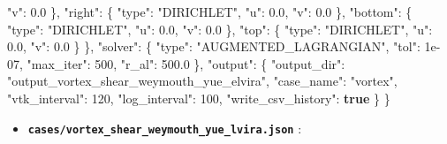 \documentclass[
  10pt,
]{article}
\newenvironment{Shaded}{}{}
\newcommand{\DataTypeTok}[1]{\textcolor[rgb]{0.56,0.13,0.00}{#1}}
\newcommand{\DecValTok}[1]{\textcolor[rgb]{0.25,0.63,0.44}{#1}}
\newcommand{\FloatTok}[1]{\textcolor[rgb]{0.25,0.63,0.44}{#1}}
\newcommand{\FunctionTok}[1]{\textcolor[rgb]{0.02,0.16,0.49}{#1}}
\newcommand{\KeywordTok}[1]{\textcolor[rgb]{0.00,0.44,0.13}{\textbf{#1}}}
\newcommand{\StringTok}[1]{\textcolor[rgb]{0.25,0.44,0.63}{#1}}
\providecommand{\tightlist}{%
  \setlength{\itemsep}{0pt}\setlength{\parskip}{0pt}}
\begin{document}
\begin{Shaded}
\begin{Highlighting}[]
      \DataTypeTok{"v"}\FunctionTok{:} \FloatTok{0.0}
    \FunctionTok{\},}
    \DataTypeTok{"right"}\FunctionTok{:} \FunctionTok{\{}
      \DataTypeTok{"type"}\FunctionTok{:} \StringTok{"DIRICHLET"}\FunctionTok{,}
      \DataTypeTok{"u"}\FunctionTok{:} \FloatTok{0.0}\FunctionTok{,}
      \DataTypeTok{"v"}\FunctionTok{:} \FloatTok{0.0}
    \FunctionTok{\},}
    \DataTypeTok{"bottom"}\FunctionTok{:} \FunctionTok{\{}
      \DataTypeTok{"type"}\FunctionTok{:} \StringTok{"DIRICHLET"}\FunctionTok{,}
      \DataTypeTok{"u"}\FunctionTok{:} \FloatTok{0.0}\FunctionTok{,}
      \DataTypeTok{"v"}\FunctionTok{:} \FloatTok{0.0}
    \FunctionTok{\},}
    \DataTypeTok{"top"}\FunctionTok{:} \FunctionTok{\{}
      \DataTypeTok{"type"}\FunctionTok{:} \StringTok{"DIRICHLET"}\FunctionTok{,}
      \DataTypeTok{"u"}\FunctionTok{:} \FloatTok{0.0}\FunctionTok{,}
      \DataTypeTok{"v"}\FunctionTok{:} \FloatTok{0.0}
    \FunctionTok{\}}
  \FunctionTok{\},}
  \DataTypeTok{"solver"}\FunctionTok{:} \FunctionTok{\{}
    \DataTypeTok{"type"}\FunctionTok{:} \StringTok{"AUGMENTED\_LAGRANGIAN"}\FunctionTok{,}
    \DataTypeTok{"tol"}\FunctionTok{:} \DecValTok{1e{-}07}\FunctionTok{,}
    \DataTypeTok{"max\_iter"}\FunctionTok{:} \DecValTok{500}\FunctionTok{,}
    \DataTypeTok{"r\_al"}\FunctionTok{:} \FloatTok{500.0}
  \FunctionTok{\},}
  \DataTypeTok{"output"}\FunctionTok{:} \FunctionTok{\{}
    \DataTypeTok{"output\_dir"}\FunctionTok{:} \StringTok{"output\_vortex\_shear\_weymouth\_yue\_elvira"}\FunctionTok{,}
    \DataTypeTok{"case\_name"}\FunctionTok{:} \StringTok{"vortex"}\FunctionTok{,}
    \DataTypeTok{"vtk\_interval"}\FunctionTok{:} \DecValTok{120}\FunctionTok{,}
    \DataTypeTok{"log\_interval"}\FunctionTok{:} \DecValTok{100}\FunctionTok{,}
    \DataTypeTok{"write\_csv\_history"}\FunctionTok{:} \KeywordTok{true}
  \FunctionTok{\}}
\FunctionTok{\}}
\end{Highlighting}
\end{Shaded}

\begin{itemize}
\tightlist
\item
  \textbf{\texttt{cases/vortex\_shear\_weymouth\_yue\_lvira.json}} :
\end{itemize}
\end{document}
